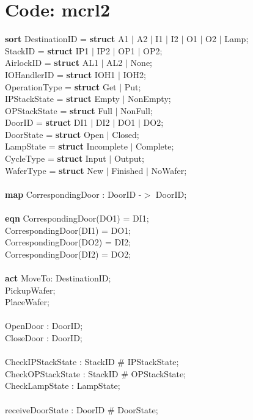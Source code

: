 \documentclass[a4paper,12pt]{article}
\begin{document}
\section{Code: mcrl2}
\textbf{sort} DestinationID = \textbf{struct} A1 $|$ A2 $|$ I1 $|$ I2 $|$ O1 $|$ O2 $|$ Lamp;
\\		  StackID = \textbf{struct} IP1 $|$ IP2 $|$ OP1 $|$ OP2;
\\		  AirlockID = \textbf{struct} AL1 $|$ AL2 $|$ None;
\\     IOHandlerID = \textbf{struct} IOH1 $|$ IOH2;
\\		  OperationType = \textbf{struct} Get $|$ Put;
\\		  IPStackState = \textbf{struct} Empty $|$ NonEmpty;
\\		  OPStackState = \textbf{struct} Full $|$ NonFull;
\\	    DoorID = \textbf{struct} DI1 $|$ DI2 $|$ DO1 $|$ DO2;		
\\		  DoorState = \textbf{struct} Open $|$ Closed;
\\			LampState = \textbf{struct} Incomplete $|$ Complete;
\\		  CycleType = \textbf{struct} Input $|$ Output;
\\		  WaferType = \textbf{struct} New $|$ Finished $|$ NoWafer;
\\
\\\textbf{map} CorrespondingDoor : DoorID -$>$ DoorID;
\\
\\\textbf{eqn} CorrespondingDoor(DO1) = DI1;
\\		CorrespondingDoor(DI1) = DO1;
\\		CorrespondingDoor(DO2) = DI2;
\\		CorrespondingDoor(DI2) = DO2;
\\
\\\textbf{act} MoveTo: DestinationID;
\\	  PickupWafer;
\\	  PlaceWafer;
\\
\\	    OpenDoor : DoorID;
\\		CloseDoor : DoorID;
\\
\\	  CheckIPStackState : StackID \# IPStackState;
\\	  CheckOPStackState : StackID \# OPStackState;
\\		CheckLampState : LampState;
\\
\\	  receiveDoorState : DoorID \# DoorState;
\end{document}
